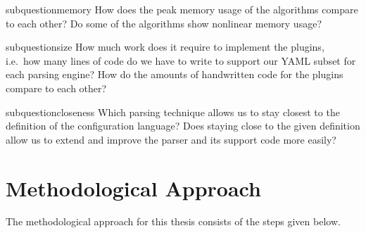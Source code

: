 \begin{restatable}{subquestion}{memory}
  \label{que:memory}
  How does the peak memory usage of the algorithms compare to each other? Do some of the algorithms show nonlinear memory usage?
\end{restatable}

\begin{restatable}{subquestion}{size}
  \label{que:size}
  How much work does it require to implement the plugins, i.e.\ how many lines of code do we have to write to support our YAML subset for each parsing engine? How do the amounts of handwritten code for the plugins compare to each other?
\end{restatable}

\begin{restatable}{subquestion}{closeness}
  \label{que:closeness}
  Which parsing technique allows us to stay closest to the definition of the configuration language? Does staying close to the given definition
  allow us to extend and improve the parser and its support code more easily?
\end{restatable}

\section{Methodological Approach}

The methodological approach for this thesis consists of the steps given below.

